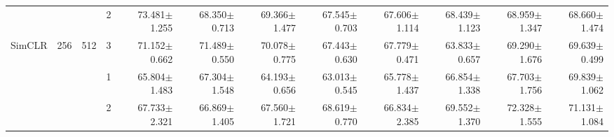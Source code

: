 \begin{table}[htpb]
{\begin{tabular}{c|c|c|c|rr|rr|rr|rr}
                                 &                                                                                 &                                                                                        & 2                                                                                         & {\color[HTML]{FE0000} 73.481$\pm$1.255} & 68.350$\pm$0.713                        & 69.366$\pm$1.477                        & 67.545$\pm$0.703                        & 67.606$\pm$1.114                        & 68.439$\pm$1.123                        & 68.959$\pm$1.347                        & 68.660$\pm$1.474                       \\
\multirow{-12}{*}{SimCLR}        & \multirow{-6}{*}{256}                                                           & \multirow{-3}{*}{512}                                                                  & 3                                                                                         & 71.152$\pm$0.662                        & 71.489$\pm$0.550                        & 70.078$\pm$0.775                        & 67.443$\pm$0.630                        & 67.779$\pm$0.471                        & 63.833$\pm$0.657                        & 69.290$\pm$1.676                        & 69.639$\pm$0.499                       \\ \hline
                                 &                                                                                 &                                                                                        & 1                                                                                         & 65.804$\pm$1.483                        & 67.304$\pm$1.548                        & 64.193$\pm$0.656                        & 63.013$\pm$0.545                        & 65.778$\pm$1.437                        & 66.854$\pm$1.338                        & 67.703$\pm$1.756                        & 69.839$\pm$1.062                       \\
                                 &                                                                                 &                                                                                        & 2                                                                                         & 67.733$\pm$2.321                        & 66.869$\pm$1.405                        & 67.560$\pm$1.721                        & 68.619$\pm$0.770                        & 66.834$\pm$2.385                        & 69.552$\pm$1.370                        & 72.328$\pm$1.555                        & 71.131$\pm$1.084                       \\

\end{tabular}}
\end{table}
